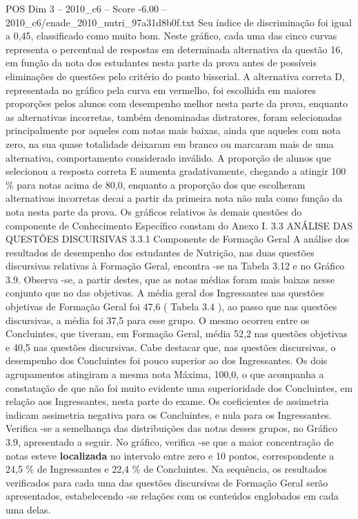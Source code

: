 \begin{textsample}{POS Dim 3 – 2010\_c6 – Score -6.00 – 2010\_c6/enade\_2010\_nutri\_97a31d8b0f.txt}
Seu índice de discriminação foi igual a 0,45, classificado como muito bom.
Neste gráfico, cada uma das cinco curvas representa o percentual de respostas em determinada alternativa da questão 16, em função da nota dos estudantes nesta parte da prova antes de possíveis eliminações de questões pelo critério do ponto bisserial.
A alternativa correta D, representada no gráfico pela curva em vermelho, foi escolhida em maiores proporções pelos alunos com desempenho melhor nesta parte da prova, enquanto as alternativas incorretas, também denominadas distratores, foram selecionadas principalmente por aqueles com notas mais baixas, ainda que aqueles com nota zero, na sua quase totalidade deixaram em branco ou marcaram mais de uma alternativa, comportamento considerado inválido.
A proporção de alunos que selecionou a resposta correta E aumenta gradativamente, chegando a atingir 100 \% para notas acima de 80,0, enquanto a proporção dos que escolheram alternativas incorretas decai a partir da primeira nota não nula como função da nota nesta parte da prova.
Os gráficos relativos às demais questões do componente de Conhecimento Específico constam do Anexo I. 3.3 ANÁLISE DAS QUESTÕES DISCURSIVAS 3.3.1 Componente de Formação Geral A análise dos resultados de desempenho dos estudantes de Nutrição, nas duas questões discursivas relativas à Formação Geral, encontra -se na Tabela 3.12 e no Gráfico 3.9.
Observa -se, a partir destes, que as notas médias foram mais baixas nesse conjunto que no das objetivas.
A média geral dos Ingressantes nas questões objetivas de Formação Geral foi 47,6 ( Tabela 3.4 ), ao passo que nas questões discursivas, a média foi 37,5 para esse grupo.
O mesmo ocorreu entre os Concluintes, que tiveram, em Formação Geral, média 52,2 nas questões objetivas e 40,5 nas questões discursivas.
Cabe destacar que, nas questões discursivas, o desempenho dos Concluintes foi pouco superior ao dos Ingressantes.
Os dois agrupamentos atingiram a mesma nota Máxima, 100,0, o que acompanha a constatação de que não foi muito evidente uma superioridade dos Concluintes, em relação aos Ingressantes, nesta parte do exame.
Os coeficientes de assimetria indicam assimetria negativa para os Concluintes, e nula para os Ingressantes.
Verifica -se a semelhança das distribuições das notas desses grupos, no Gráfico 3.9, apresentado a seguir.
No gráfico, verifica -se que a maior concentração de notas esteve \textbf{localizada} no intervalo entre zero e 10 pontos, correspondente a 24,5 \% de Ingressantes e 22,4 \% de Concluintes.
Na sequência, os resultados verificados para cada uma das questões discursivas de Formação Geral serão apresentados, estabelecendo -se relações com os conteúdos englobados em cada uma delas.

\end{textsample}
